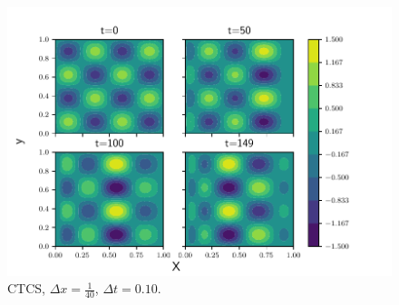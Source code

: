 \begin{figure}[htp]
  \centering
  \includegraphics[width=\textwidth]{../figures/bounded_2d.pdf}
  \caption{CTCS, $\Delta x = \frac{1}{40}$, $\Delta t = 0.10$.}
  \label{fig:2d_bounded}
\end{figure}
